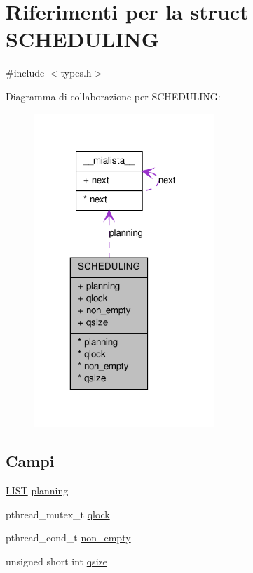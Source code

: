 \hypertarget{structSCHEDULING}{
\section{Riferimenti per la struct SCHEDULING}
\label{structSCHEDULING}
}


{\ttfamily \#include $<$types.h$>$}



Diagramma di collaborazione per SCHEDULING:
\nopagebreak
\begin{figure}[H]
\begin{center}
\leavevmode
\includegraphics[width=193pt]{structSCHEDULING__coll__graph}
\end{center}
\end{figure}
\subsection*{Campi}
{\bf }\par
\begin{DoxyCompactItemize}
\item 
\hyperlink{struct____mialista____}{LIST} \hyperlink{structSCHEDULING_a229bb49fdd326aa1018d1722fe912032}{planning}
\item 
pthread\_\-mutex\_\-t \hyperlink{structSCHEDULING_aaec89a3dc46fa4387acabc5d0a82f0bd}{qlock}
\item 
pthread\_\-cond\_\-t \hyperlink{structSCHEDULING_a5b4e86c8746c9ae4e032fd4d47947af8}{non\_\-empty}
\item 
unsigned short int \hyperlink{structSCHEDULING_a2e6094f26221c0be66ac7def1d02d337}{qsize}
\end{DoxyCompactItemize}



